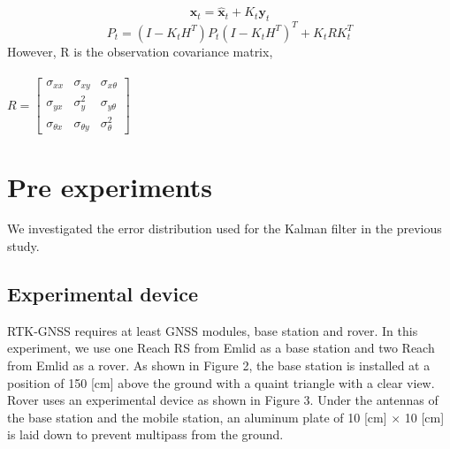 \documentclass[a4paper]{article}
\begin{document}
%
%
\begin{equation}
    \bm{\hat{x}}_{t} = \bm{\hat{x}}_{t}+K_{t}\bm{y}_{t}
    \label{eq:8}
\end{equation}
%
%
\begin{equation}
    P_{t} = (I-K_{t}H^{T})P_{t}(I-K_{t}H^{T})^{T} + K_{t}RK_{t}^{T}
    \label{eq:9}
\end{equation}
However, R is the observation covariance matrix, \\ \\ $R = \begin{bmatrix} \sigma_{xx} & \sigma_{xy} & \sigma_{x\theta} \\  \sigma_{yx} & \sigma_{y}^{2} & \sigma_{y\theta} \\  \sigma_{\theta x} & \sigma_{\theta y} & \sigma_{\theta}^{2} \end{bmatrix}$\\


\section{Pre experiments}
We investigated the error distribution used for the Kalman filter in the previous study.
\subsection{Experimental device}
RTK-GNSS requires at least GNSS modules, base station and rover. 
In this experiment, we use one Reach RS\cite{reach rs} from Emlid as a base station 
and two Reach\cite{reach} from Emlid as a rover.
As shown in Figure 2, the base station is installed at a position of 150 [cm] above the ground 
with a quaint triangle with a clear view.
Rover uses an experimental device as shown in Figure 3. 
Under the antennas of the base station and the mobile station, 
an aluminum plate of 10 [cm] $\times$ 10 [cm] is laid down to prevent multipass from the ground.
\end{document}
